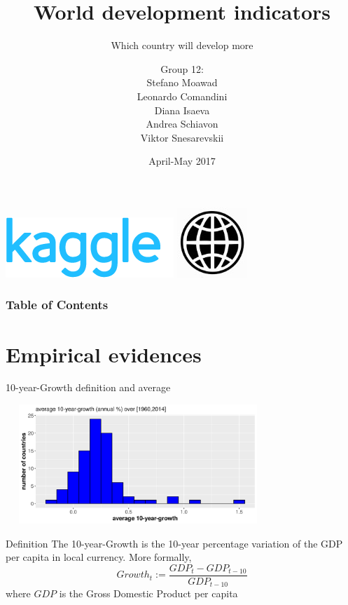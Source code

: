 \documentclass[9pt]{beamer}
\title[World development indicators]{\huge World development indicators}
\subtitle[Which country will develop more]{\large Which country will develop more}
\author[Moawad, Comandini, Isaeva, Schiavon, Snesarevskii] {{\Large Group 12:\\}Stefano Moawad\\Leonardo Comandini\\Diana Isaeva\\Andrea Schiavon\\Viktor Snesarevskii}
\date{April-May 2017}
\begin{document}
	\begin{frame}
	\titlepage
	\vfill
	\begin{flushright}
		\includegraphics[height=.7cm]{kaggle.png}\quad
		\includegraphics[height=.7cm]{worldbank.jpg}
	\end{flushright}
\end{frame}

\begin{frame}
	\frametitle{Table of Contents}
	\tableofcontents
\end{frame}


\section{Empirical evidences}

\begin{frame}{10-year-Growth definition and average}
	\begin{block}{}
		\includegraphics[height=4.5cm,width=10cm]{growth_hist.png}
	\end{block}
	\begin{block}{Definition}
		 The \alert{10-year-Growth} is the 10-year percentage variation of the GDP per capita in local currency. More formally,
		\begin{equation}
		Growth_{t} := \frac{GDP_{t}-GDP_{t-10}}{GDP_{t-10}}
		\end{equation}
		where $ GDP $ is the Gross Domestic Product per capita
		
	\end{block}
\end{frame}
\end{document}
